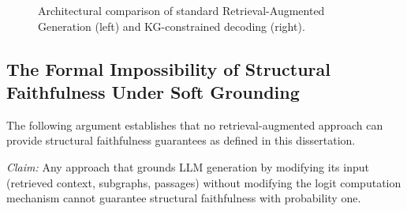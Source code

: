 \begin{figure}[t]
{
    }
    \caption{Architectural comparison of standard Retrieval-Augmented Generation (left) and KG-constrained decoding (right).}
    \label{fig:rag_vs_constrained}
\end{figure}

\subsection{The Formal Impossibility of Structural Faithfulness Under Soft Grounding}

The following argument establishes that no retrieval-augmented approach can
provide structural faithfulness guarantees as defined in this dissertation.

\textit{Claim:} Any approach that grounds LLM generation by modifying its input
(retrieved context, subgraphs, passages) without modifying the logit computation
mechanism cannot guarantee structural faithfulness with probability one.

